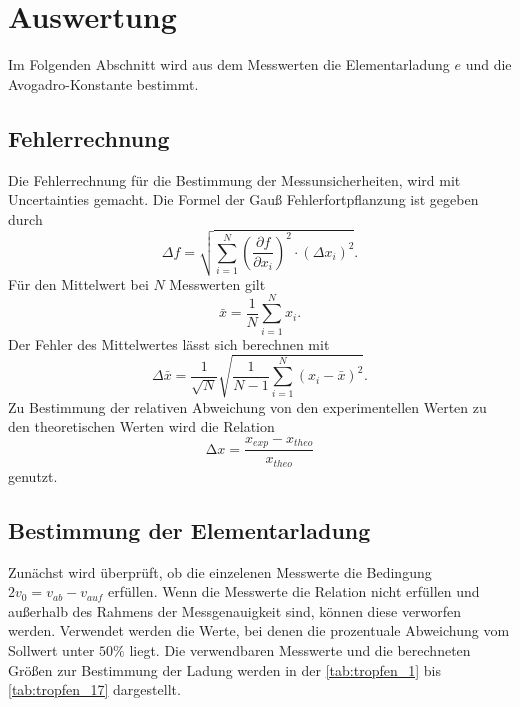 \section{Auswertung}
\label{sec:auswertung}

Im Folgenden Abschnitt wird aus dem Messwerten die Elementarladung $e$ und die Avogadro-Konstante bestimmt.
\subsection{Fehlerrechnung}
\label{sec:Fehlerrechnung}
Die Fehlerrechnung für die Bestimmung der Messunsicherheiten, wird mit Uncertainties \cite{uncertainties} gemacht.
Die Formel der Gauß Fehlerfortpflanzung ist gegeben durch
\begin{equation}
    \Delta f=\sqrt{\sum_{i=1}^N\left(\frac{\partial f}{\partial x_i}\right)^2 \cdot\left(\Delta x_i\right)^2}.
    \label{eqn:gauss}
\end{equation}
Für den Mittelwert bei $N$ Messwerten gilt 
\begin{equation}
    \bar{x} = \frac{1}{N}\sum\limits_{i = 1}^N x_i .
    \label{eqn:mittelwert}
\end{equation}
Der Fehler des Mittelwertes lässt sich berechnen mit
\begin{equation}
    \Delta \bar{x}=\frac{1}{\sqrt{N}} \sqrt{\frac{1}{N-1} \sum_{i=1}^N\left(x_i-\bar{x}\right)^2}.
    \label{eqn:mittelwertfehler}
\end{equation}
Zu Bestimmung der relativen Abweichung von den experimentellen Werten zu den theoretischen Werten wird die
Relation 
\begin{equation}
    \increment x = \frac{x_{exp}-x_{theo}}{x_{theo}}
\end{equation} 
genutzt.

\subsection{Bestimmung der Elementarladung}
\label{sec:bestimmung der elementarladung}

Zunächst wird überprüft, ob die einzelenen Messwerte die Bedingung $2v_0 = v_{ab}-v_{auf}$ erfüllen.
Wenn die Messwerte die Relation nicht erfüllen und außerhalb des Rahmens der Messgenauigkeit sind, können 
diese verworfen werden. Verwendet werden die Werte, bei denen die prozentuale Abweichung vom Sollwert unter
$50 \%$ liegt. Die verwendbaren Messwerte und die berechneten Größen zur Bestimmung der Ladung werden in der \autoref{tab:tropfen_1} bis \autoref{tab:tropfen_17} dargestellt.


